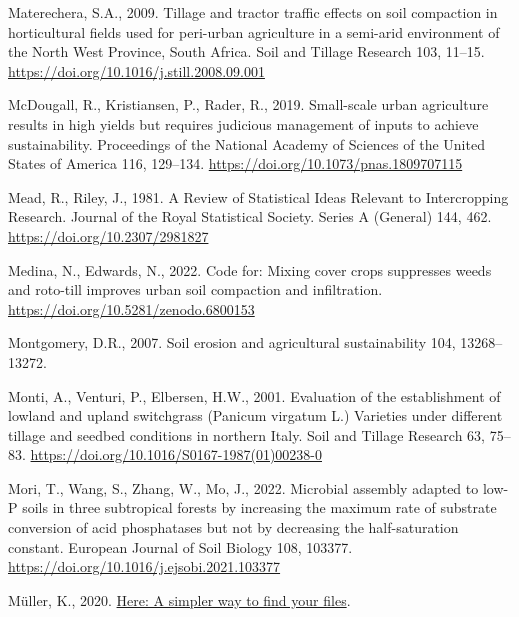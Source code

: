 \documentclass[
  12pt,
]{article}
\newlength{\cslhangindent}
\newlength{\cslentryspacingunit} %
\newenvironment{CSLReferences}[2] %
 {%
  \setlength{\parindent}{0pt}
  \ifodd #1
  \let\oldpar\par
  \def\par{\hangindent=\cslhangindent\oldpar}
  \fi
  \setlength{\parskip}{#2\cslentryspacingunit}
 }%
 {}
\begin{document}
\begin{CSLReferences}{1}{0}
\leavevmode{}%
Materechera, S.A., 2009. Tillage and tractor traffic effects on soil compaction in horticultural fields used for peri-urban agriculture in a semi-arid environment of the {North West Province}, {South Africa}. Soil and Tillage Research 103, 11--15. \url{https://doi.org/10.1016/j.still.2008.09.001}

\leavevmode{}%
McDougall, R., Kristiansen, P., Rader, R., 2019. Small-scale urban agriculture results in high yields but requires judicious management of inputs to achieve sustainability. Proceedings of the National Academy of Sciences of the United States of America 116, 129--134. \url{https://doi.org/10.1073/pnas.1809707115}

\leavevmode{}%
Mead, R., Riley, J., 1981. A {Review} of {Statistical Ideas Relevant} to {Intercropping Research}. Journal of the Royal Statistical Society. Series A (General) 144, 462. \url{https://doi.org/10.2307/2981827}

\leavevmode{}%
Medina, N., Edwards, N., 2022. Code for: {Mixing} cover crops suppresses weeds and roto-till improves urban soil compaction and infiltration. \url{https://doi.org/10.5281/zenodo.6800153}

\leavevmode{}%
Montgomery, D.R., 2007. Soil erosion and agricultural sustainability 104, 13268--13272.

\leavevmode{}%
Monti, A., Venturi, P., Elbersen, H.W., 2001. Evaluation of the establishment of lowland and upland switchgrass ({Panicum} virgatum {L}.) Varieties under different tillage and seedbed conditions in northern {Italy}. Soil and Tillage Research 63, 75--83. \url{https://doi.org/10.1016/S0167-1987(01)00238-0}

\leavevmode{}%
Mori, T., Wang, S., Zhang, W., Mo, J., 2022. Microbial assembly adapted to low-{P} soils in three subtropical forests by increasing the maximum rate of substrate conversion of acid phosphatases but not by decreasing the half-saturation constant. European Journal of Soil Biology 108, 103377. \url{https://doi.org/10.1016/j.ejsobi.2021.103377}

\leavevmode{}%
Müller, K., 2020. \href{https://CRAN.R-project.org/package=here}{Here: A simpler way to find your files}.


\end{CSLReferences}
\end{document}
